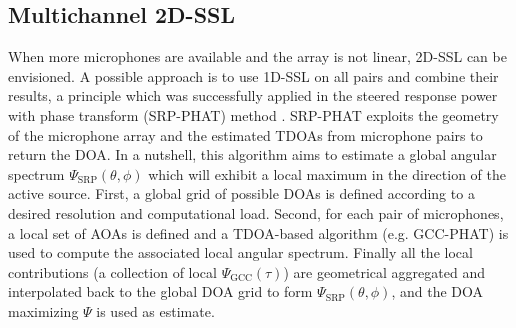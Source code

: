 \subsection{Multichannel 2D-SSL}\label{subsec:mirage:2D-SSL}
When more microphones are available and the array is not linear, 2D-SSL can be envisioned.
A possible approach is to use 1D-SSL on all pairs and combine their results,
a principle which was successfully applied in the steered response power with phase transform (SRP-PHAT) method .
SRP-PHAT exploits the geometry of the microphone array and the estimated TDOAs from microphone pairs to return the DOA.
In a nutshell, this algorithm aims to estimate a global angular spectrum $\Psi_{\text{SRP}}(\theta,\phi)$
which will exhibit a local maximum in the direction of the active source.
First, a global grid of possible DOAs is defined according to a desired resolution and computational load.
Second, for each pair of microphones, a local set of AOAs is defined and a TDOA-based algorithm (e.g. GCC-PHAT)
is used to compute the associated local angular spectrum.
Finally all the local contributions (a collection of local $\Psi_\text{GCC}(\tau)$) are geometrical
aggregated and interpolated back to the global DOA grid to form $\Psi_{\text{SRP}}(\theta,\phi)$,
and the DOA maximizing $\Psi$ is used as estimate.



